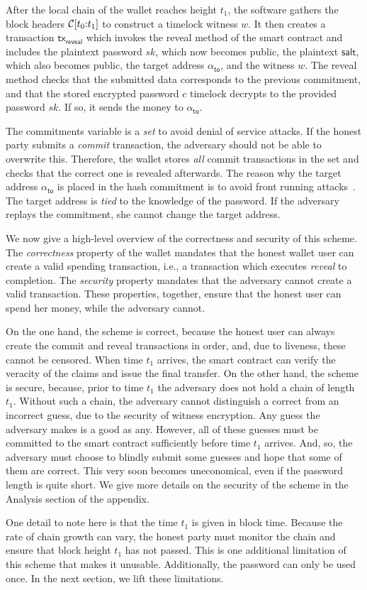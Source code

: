 After the local chain of the wallet reaches height $t_1$, the software gathers the block headers
$\mathcal{C}[t_0{:}t_1]$ to construct a timelock witness $w$. It then creates a transaction
$\textsf{tx}_\textsf{reveal}$ which invokes the \textsf{reveal} method of the smart contract
and includes the plaintext password $sk$, which now becomes public, the plaintext
$\textsf{salt}$, which also becomes public, the target address $\alpha_{\textsf{to}}$, and
the witness $w$. The \textsf{reveal} method checks that the submitted data corresponds to the
previous commitment, and that the stored encrypted password $c$ timelock decrypts to the provided
password $sk$. If so, it sends the money to $\alpha_{\textsf{to}}$.

The \textsf{commitments} variable is a \emph{set} to avoid denial of service attacks.
If the honest party submits a \emph{commit} transaction, the adversary should not be
able to overwrite this. Therefore, the wallet stores \emph{all} commit transactions in
the set and checks that the correct one is revealed afterwards. The reason why the
target address $\alpha_\textsf{to}$ is placed in the hash commitment is to avoid front
running attacks~\cite{flashboys}. The target address is \emph{tied} to the knowledge of the password.
If the adversary replays the commitment, she cannot change the target address.

We now give a high-level overview of the correctness and security of this scheme.
The \emph{correctness} property of the wallet mandates that the honest wallet user can
create a valid spending transaction, i.e., a transaction which executes
\emph{reveal} to completion. The \emph{security} property mandates that the adversary
cannot create a valid transaction. These properties, together, ensure that the honest user
can spend her money, while the adversary cannot.

On the one hand, the scheme is correct, because the honest user can always create the commit
and reveal transactions in order, and, due to liveness, these cannot be censored. When time
$t_1$ arrives, the smart contract can verify the veracity of the claims and issue the final
transfer. On the other hand, the scheme is secure, because, prior to time $t_1$ the adversary
does not hold a chain of length $t_1$. Without such a chain, the adversary cannot distinguish
a correct from an incorrect guess, due to the security of witness encryption. Any guess the
adversary makes is a good as any. However, all of these guesses must be committed to the smart
contract sufficiently before time $t_1$ arrives. And, so, the adversary must choose to blindly
submit some guesses and hope that some of them are correct. This very soon becomes uneconomical,
even if the password length is quite short. We give more details on the security of the scheme
in the Analysis section of the appendix.

One detail to note here is that the time $t_1$ is given in block time. Because the rate of
chain growth can vary, the honest party must monitor the chain and ensure that block
height $t_1$ has not passed. This is one additional limitation of this scheme that makes it
unusable. Additionally, the password can only be used once.
In the next section, we lift these limitations.
